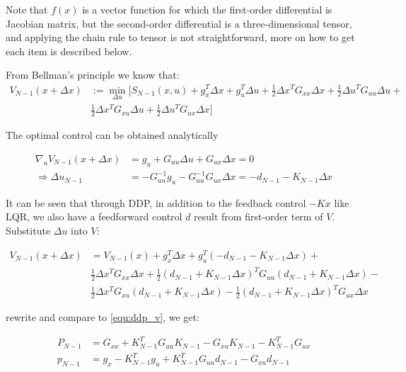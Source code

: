 Note that $f(x)$ is a vector function for which the first-order differential is Jacobian matrix, but the second-order differential is a three-dimensional tensor, and applying the chain rule to tensor is not straightforward, more on how to get each item is described below.

From Bellman's principle we know that:
\begin{equation}
    \begin{aligned} 
        V_{N-1}(x + \Delta x) & := \min_{\Delta u}[S_{N-1}(x, u) + g_x^T \Delta x + g_u^T \Delta u + \frac{1}{2} \Delta x^T G_{xx} \Delta x + \frac{1}{2} \Delta u^T G_{uu} \Delta u + \\ & \frac{1}{2} \Delta x^T G_{xu} \Delta u + \frac{1}{2} \Delta u^T G_{ux} \Delta x] 
    \end{aligned}
\end{equation}

The optimal control can be obtained analytically

\begin{equation}
    \begin{aligned} \nabla_u V_{N-1}(x + \Delta x) & = g_u + G_{uu} \Delta u + G_{ux} \Delta x = 0 \\ \Rightarrow \Delta u_{N-1} & = -G_{uu}^{-1} g_u - G_{uu}^{-1}G_{ux}\Delta x = -d_{N-1} - K_{N-1} \Delta x \end{aligned}
\end{equation}

It can be seen that through DDP, in addition to the feedback control $- Kx$ like LQR, we also have a feedforward control $d$ result from first-order term of $V$. Substitute $\Delta u$ into $V$:

\begin{equation}
    \begin{aligned} V_{N-1}(x + \Delta x) &= V_{N-1}(x) + g_x^T \Delta x + g_u^T (-d_{N-1} - K_{N-1} \Delta x) + \\ &\frac{1}{2} \Delta x^T G_{xx} \Delta x + \frac{1}{2} (d_{N-1} + K_{N-1} \Delta x)^T G_{uu} (d_{N-1} + K_{N-1} \Delta x) - \\ &\frac{1}{2} \Delta x^T G_{xu} (d_{N-1} + K_{N-1} \Delta x) - \frac{1}{2} (d_{N-1} + K_{N-1} \Delta x)^T G_{ux} \Delta x  \end{aligned}
\end{equation}

rewrite and compare to \eqref{equ:ddp_v}, we get:

\begin{equation}
    \begin{aligned} P_{N-1} & = G_{xx} + K_{N-1}^T G_{uu} K_{N-1} - G_{xu} K_{N-1} - K_{N-1}^T G_{ux} \\ p_{N-1} & = g_x - K_{N-1}^T g_u + K_{N-1}^T G_{uu} d_{N-1} - G_{xu} d_{N-1} \end{aligned}
\end{equation}

